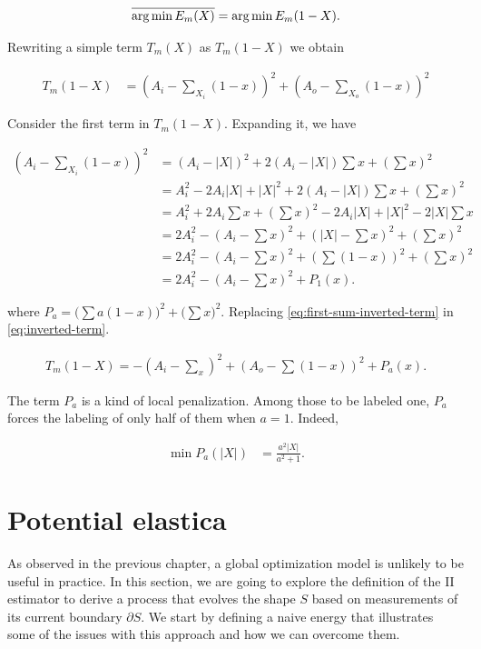 \begin{align*}
	\overline{\operatorname*{arg\,min} E_m(X)} = \operatorname*{arg\,min} E_m(1-X).
\end{align*}

Rewriting a simple term $T_m(X)$ as $T_m(1-X)$ we obtain

\begin{align}
	T_m(1-X) &= (A_i - \sum_{X_i}{(1-x)})^2 + (A_o - \sum_{X_o}{(1-x)})^2
	\label{eq:inverted-term}
\end{align}

Consider the first term in $T_m(1-X)$. Expanding it, we have

\begin{align}
	(A_i - \sum_{X_i}{(1-x)})^2 &= (A_i - |X|)^2 + 2(A_i-|X|)\sum{x} + ( \sum{x} )^2 \nonumber  \\
	&= A_i^2 -2A_i|X| + |X|^2 + 2(A_i - |X|)\sum{x} + (\sum{x})^2 \nonumber  \\
	&= A_i^2 + 2A_i\sum{x} + (\sum{x})^2 - 2A_i|X| + |X|^2 - 2|X|\sum{x} \nonumber  \\
	&= 2A_i^2 - (A_i - \sum{x})^2 + (|X| - \sum{x})^2 + (\sum{x})^2 \nonumber \\
	&= 2A_i^2 - (A_i - \sum{x})^2 + (\sum{(1-x)})^2 + (\sum{x})^2 \nonumber  \\
	&= 2A_i^2 - (A_i - \sum{x})^2 + P_1(x).
	\label{eq:first-sum-inverted-term}
\end{align}

where  $P_a=\Big( \sum{a(1-x)} \Big)^2 + \Big(\sum{x}\Big)^2$. Replacing \eqref{eq:first-sum-inverted-term} in \eqref{eq:inverted-term}.

\begin{align}
	T_m(1-X) = -(A_i - \sum_{x})^2 + (A_o - \sum{(1-x)})^2 + P_a(x).
\end{align}

The term $P_a$ is a kind of local penalization. Among those to be labeled one, $P_a$ forces the labeling of only half of them when $a=1$. Indeed,

\begin{align*}
	\min P_a(|X|) &= \frac{a^2|X|}{a^2+1}.
\end{align*}





\section{Potential elastica}

As observed in the previous chapter, a global optimization model is unlikely to be useful in practice. In this section, we are going to explore the definition of the II estimator to derive a process that evolves the shape $S$ based on measurements of its current boundary $\partial S$. We start by defining a naive energy that illustrates some of the issues with this approach and how we can overcome them.

